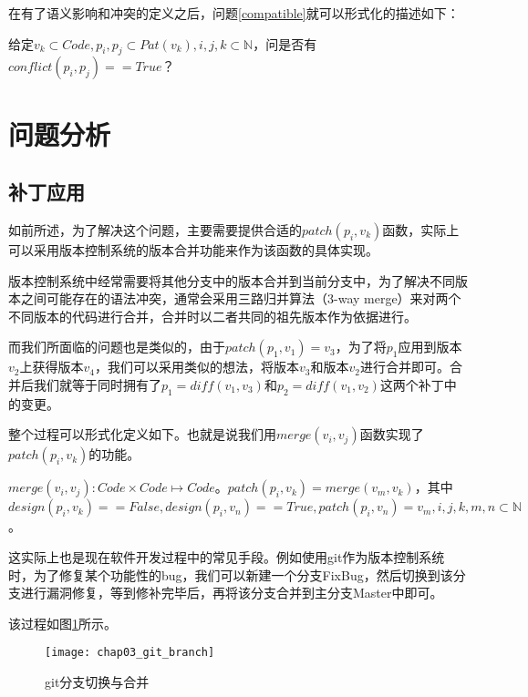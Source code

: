 在有了语义影响和冲突的定义之后，问题\ref {compatible}就可以形式化的描述如下：

\begin{problem}
	\label {compatible_formal}
	给定$v_k \subset Code, p_i,p_j \subset Pat(v_k),i,j,k \subset \mathbb{N}$，问是否有$conflict(p_i,p_j) == True$？
\end{problem}

\section{问题分析}

\subsection{补丁应用}

如前所述，为了解决这个问题，主要需要提供合适的$patch(p_i,v_k)$函数，实际上可以采用版本控制系统的版本合并功能来作为该函数的具体实现。

版本控制系统中经常需要将其他分支中的版本合并到当前分支中，为了解决不同版本之间可能存在的语法冲突，通常会采用三路归并算法（3-way merge）来对两个不同版本的代码进行合并，合并时以二者共同的祖先版本作为依据进行。

而我们所面临的问题也是类似的，由于$patch(p_1,v_1) = v_3$，为了将$p_1$应用到版本$v_2$上获得版本$v_4$，我们可以采用类似的想法，将版本$v_3$和版本$v_2$进行合并即可。合并后我们就等于同时拥有了$p_1 = diff(v_1,v_3)$和$p_2 = diff(v_1,v_2)$这两个补丁中的变更。

整个过程可以形式化定义如下。也就是说我们用$merge(v_i,v_j)$函数实现了$patch(p_i,v_k)$的功能。

\begin{definition}
	$merge(v_i,v_j): Code \times Code \mapsto Code$。$patch(p_i,v_k) = merge(v_m,v_k)$，其中$design(p_i,v_k) == False,design(p_i,v_n) == True,patch(p_i,v_n) = v_m,i,j,k,m,n \subset \mathbb{N}$。
\end{definition}

这实际上也是现在软件开发过程中的常见手段。例如使用git作为版本控制系统时，为了修复某个功能性的bug，我们可以新建一个分支FixBug，然后切换到该分支进行漏洞修复，等到修补完毕后，再将该分支合并到主分支Master中即可。

该过程如图\ref{git_branch}所示。

\begin{figure}[H]	
	\centering
	\texttt{[image: chap03\_git\_branch]}
	\caption {git分支切换与合并}	
	\label {git_branch}
\end{figure}


